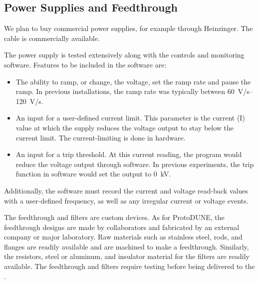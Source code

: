 \subsection{Power Supplies and Feedthrough}
\label{sec:fdsp-hv-supplies-feedthrough}

We plan to buy commercial power supplies, %
for example through Heinzinger. The  cable is commercially available.

The power supply is tested extensively along with the controls and monitoring software.  Features to be included in the software are:
\begin{itemize}
\item The ability to ramp, or change, the voltage, set the ramp rate and pause the ramp. %
In previous installations, the ramp rate was typically between \SIrange{60}{120}{V/s}.
\item An input for a user-defined current limit.  This parameter is the current (I) value at which the supply reduces the voltage output to stay below the current limit.  The current-limiting is done in hardware.
\item An input for a trip threshold.  At this current reading, the program would reduce the voltage output through software.  In previous experiments, the trip function in software would set the output to \SI{0}{kV}.
\end{itemize}
Additionally, the software must
record the current and voltage read-back values with a user-defined frequency, as well as any irregular current or voltage events.


The  feedthrough and filters are custom devices. As for ProtoDUNE, the feedthrough  designs are made by collaborators and fabricated by an external company or major laboratory.
 Raw materials such as stainless steel,  rods, and flanges are readily available and are machined to make a feedthrough. Similarly, the resistors, steel or aluminum, and insulator material for the filters are readily available. The feedthrough and filters require testing before being delivered to the . %
